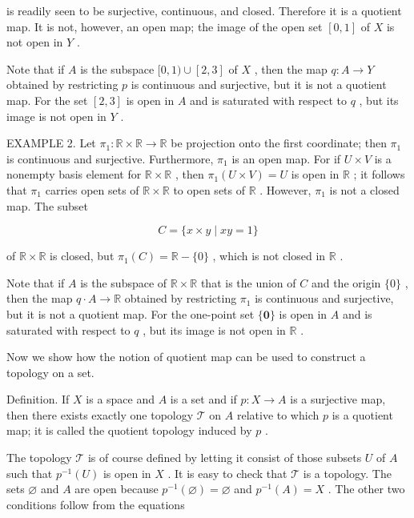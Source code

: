 is readily seen to be surjective, continuous, and closed. Therefore it is a quotient map. It is not, however, an open map; the image of the open set \(\left\lbrack  {0,1}\right\rbrack\) of \(X\) is not open in \(Y\) .

Note that if \(A\) is the subspace \(\lbrack 0,1) \cup  \left\lbrack  {2,3}\right\rbrack\) of \(X\) , then the map \(q : A \rightarrow  Y\) obtained by restricting \(p\) is continuous and surjective, but it is not a quotient map. For the set \(\left\lbrack  {2,3}\right\rbrack\) is open in \(A\) and is saturated with respect to \(q\) , but its image is not open in \(Y\) .

EXAMPLE 2. Let \({\pi }_{1} : \mathbb{R} \times  \mathbb{R} \rightarrow  \mathbb{R}\) be projection onto the first coordinate; then \({\pi }_{1}\) is continuous and surjective. Furthermore, \({\pi }_{1}\) is an open map. For if \(U \times  V\) is a nonempty basis element for \(\mathbb{R} \times  \mathbb{R}\) , then \({\pi }_{1}\left( {U \times  V}\right)  = U\) is open in \(\mathbb{R}\) ; it follows that \({\pi }_{1}\) carries open sets of \(\mathbb{R} \times  \mathbb{R}\) to open sets of \(\mathbb{R}\) . However, \({\pi }_{1}\) is not a closed map. The subset

\[
C = \{ x \times  y \mid  {xy} = 1\}
\]

of \(\mathbb{R} \times  \mathbb{R}\) is closed, but \({\pi }_{1}\left( C\right)  = \mathbb{R} - \{ 0\}\) , which is not closed in \(\mathbb{R}\) .

Note that if \(A\) is the subspace of \(\mathbb{R} \times  \mathbb{R}\) that is the union of \(C\) and the origin \(\{ 0\}\) , then the map \(q \cdot  A \rightarrow  \mathbb{R}\) obtained by restricting \({\pi }_{1}\) is continuous and surjective, but it is not a quotient map. For the one-point set \(\{ \mathbf{0}\}\) is open in \(A\) and is saturated with respect to \(q\) , but its image is not open in \(\mathbb{R}\) .

Now we show how the notion of quotient map can be used to construct a topology on a set.

Definition. If \(X\) is a space and \(A\) is a set and if \(p : X \rightarrow  A\) is a surjective map, then there exists exactly one topology \(\mathcal{T}\) on \(A\) relative to which \(p\) is a quotient map; it is called the quotient topology induced by \(p\) .

The topology \(\mathcal{T}\) is of course defined by letting it consist of those subsets \(U\) of \(A\) such that \({p}^{-1}\left( U\right)\) is open in \(X\) . It is easy to check that \(\mathcal{T}\) is a topology. The sets \(\varnothing\) and \(A\) are open because \({p}^{-1}\left( \varnothing \right)  = \varnothing\) and \({p}^{-1}\left( A\right)  = X\) . The other two conditions follow from the equations

